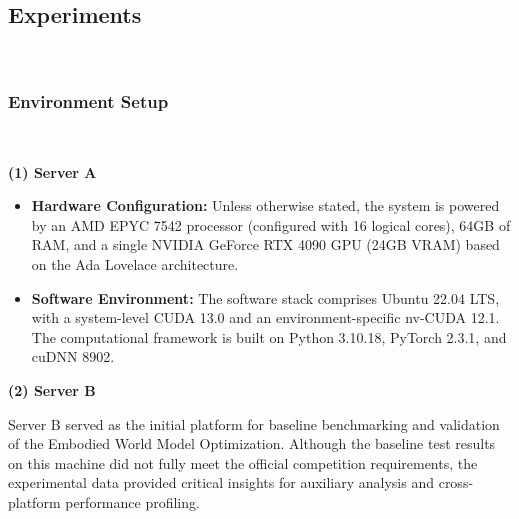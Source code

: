 




\subsection{Experiments}
\ 

\subsubsection{Environment Setup}\label{sec:unif exp envir}
\ 


\textbf{(1) Server A}
\begin{itemize}
    \item \textbf{Hardware Configuration:} Unless otherwise stated, the system is powered by an AMD EPYC 7542 processor (configured with 16 logical cores), 64GB of RAM, and a single NVIDIA GeForce RTX 4090 GPU (24GB VRAM) based on the Ada Lovelace architecture.

    \item \textbf{Software Environment:} The software stack comprises Ubuntu 22.04 LTS, with a system-level CUDA 13.0 and an environment-specific nv-CUDA 12.1. The computational framework is built on Python 3.10.18, PyTorch 2.3.1, and cuDNN 8902.
\end{itemize}

\textbf{(2) Server B}

Server B served as the initial platform for baseline benchmarking and validation of the Embodied World Model Optimization. Although the baseline test results on this machine did not fully meet the official competition requirements, the experimental data provided critical insights for auxiliary analysis and cross-platform performance profiling.

